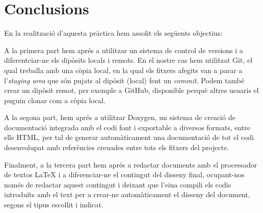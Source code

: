 \documentclass{article}
\begin{document}
\section{Conclusions}
En la realització d'aquesta pràctica hem assolit els següents objectius: \bigskip

A la primera part hem aprés a utilitzar un sistema de control de versions i a diferentciar-ne els dipòsits locals i remots. En el nostre cas hem utilitzat Git, el qual treballa amb una còpia local, en la qual els fitxers afegits van a parar a l'\textit{staging area} que són pujats al dipòsit (local) fent un \textit{commit}. Podem també crear un dipòsit remot, per exemple a GitHub, disponible perquè altres usuaris el puguin clonar com a còpia local. \bigskip

A la segona part, hem aprés a utilitzar Doxygen, un sistema de creació de documentació integrada amb el codi font i exportable a diversos formats, entre ells HTML, per tal de generar automàticament una documentació de tot el codi desenvolupat amb referències creuades entre tots els fitxers del projecte. \bigskip

Finalment, a la tercera part hem aprés a redactar documents amb el processador de textos LaTeX i a diferenciar-ne el contingut del disseny final, ocupant-nos només de redactar aquest contingut i deixant que l'eina compili els codis introduïts amb el text per a crear-ne automàticament el disseny del document, segons el tipus escollit i indicat. \bigskip
\end{document}
